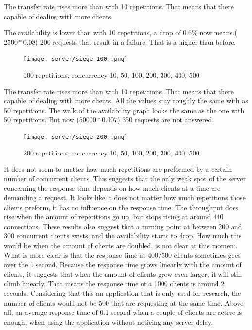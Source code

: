 The transfer rate rises more than with 10 repetitions. That means that there capable of dealing with more clients.

The availability is lower than with 10 repetitions, a drop of 0.6\% now means ($2500 * 0.08$) 200 requests that result in a failure. That is a higher than before.
\begin{figure}[H]
\center
\texttt{[image: server/siege\_100r.png]}
\caption{100 repetitions, concurrency 10, 50, 100, 200, 300, 400, 500}
\end{figure}
The transfer rate rises more than with 10 repetitions. That means that there capable of dealing with more clients.
All the values stay roughly the same with as 50 repetitions. The walk of the availability graph looks the same as the one with 50 repetitions. But now ($50000 * 0.007$) 350 requests are not answered.

\begin{figure}[H]
\center
\texttt{[image: server/siege\_200r.png]}
\caption{200 repetitions, concurrency 10, 50, 100, 200, 300, 400, 500}
\end{figure}

It does not seem to matter how much repetitions are preformed by a certain number of concurrent clients. This suggests that the only weak spot of the server concerning the response time depends on how much clients at a time are demanding a request. It looks like it does not matter how much repetitions those clients preform, it has no influence on the response time. The throughput does rise when the amount of repetitions go up, but stops rising at around 440 connections. 
These results also suggest that a turning point at between 200 and 300 concurrent clients exists, and the availability starts to drop. How much this would be when the amount of clients are doubled, is not clear at this moment. What is more clear is that the response time at 400/500 clients sometimes goes over the 1 second. Because the response time grows linearly with the amount of clients, it suggests that when the amount of clients grow even larger, it will still climb linearly. That means the response time of a 1000 clients is around 2 seconds.
Considering that this an application that is only used for research, the number of clients would not be 500 that are requesting at the same time. Above all, an average response time of 0.1 second when a couple of clients are active is enough, when using the application without noticing any server delay.

